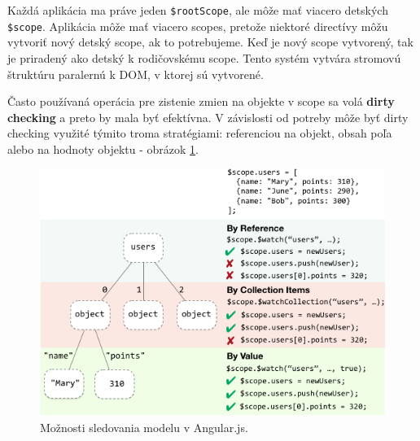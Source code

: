Každá aplikácia ma práve jeden \verb|$rootScope|, ale môže mať viacero detských \verb|$scope|. Aplikácia môže mať viacero scopes, pretože niektoré directívy môžu vytvoriť nový detský scope, ak to potrebujeme. Keď je nový scope vytvorený, tak je priradený ako detský k rodičovskému scope. Tento systém vytvára stromovú štruktúru paralernú k DOM, v ktorej sú vytvorené.\cite{angular-docs}

Často používaná operácia pre zistenie zmien na objekte v scope sa volá \textbf{dirty checking} a preto by mala byť efektívna. V závislosti od potreby môže byť dirty checking využité týmito troma stratégiami: referenciou na objekt, obsah poľa alebo na hodnoty objektu - obrázok \ref{img-angular-watch}.

\begin{figure}[H]
  \centering
  \includegraphics[scale=0.7]{img/angular/concepts-scope-watch-strategies.png}
  \caption{Možnosti sledovania modelu v Angular.js.}
  \label{img-angular-watch}
\end{figure}

